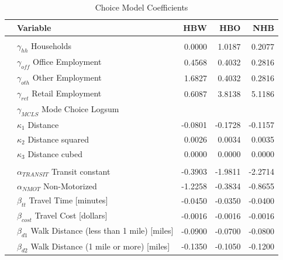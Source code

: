 \begin{table}

\caption{\label{tab:coeffs}Choice Model Coefficients}
\centering
\begin{tabular}[t]{llrrr}
\toprule
 & Variable & HBW & HBO & NHB\\
\midrule
\addlinespace[0.3em]
\multicolumn{5}{l}{\textbf{Destination Choice}}\\
\hspace{1em} & $\gamma_{hh}$ Households & 0.0000 & 1.0187 & 0.2077\\
\hspace{1em} & $\gamma_{off}$ Office Employment & 0.4568 & 0.4032 & 0.2816\\
\hspace{1em} & $\gamma_{oth}$ Other Employment & 1.6827 & 0.4032 & 0.2816\\
\hspace{1em} & $\gamma_{ret}$ Retail Employment & 0.6087 & 3.8138 & 5.1186\\
\hspace{1em} & $\gamma_{MCLS}$ Mode Choice Logsum &  &  & \\
\hspace{1em} & $\kappa_1$ Distance & -0.0801 & -0.1728 & -0.1157\\
\hspace{1em} & $\kappa_2$ Distance squared & 0.0026 & 0.0034 & 0.0035\\
\hspace{1em} & $\kappa_3$ Distance cubed & 0.0000 & 0.0000 & 0.0000\\
\cmidrule{1-5}
\addlinespace[0.3em]
\multicolumn{5}{l}{\textbf{Mode Choice}}\\

\hspace{1em} & $\alpha_{TRANSIT}$ Transit constant & -0.3903 & -1.9811 & -2.2714\\
\hspace{1em} & $\alpha_{NMOT}$ Non-Motorized & -1.2258 & -0.3834 & -0.8655\\
\hspace{1em} & $\beta_{tt}$ Travel Time [minutes] & -0.0450 & -0.0350 & -0.0400\\
\hspace{1em} & $\beta_{cost}$ Travel Cost [dollars] & -0.0016 & -0.0016 & -0.0016\\
\hspace{1em} & $\beta_{d1}$ Walk Distance (less than 1 mile) [miles] & -0.0900 & -0.0700 & -0.0800\\
\hspace{1em} & $\beta_{d2}$ Walk Distance (1 mile or more) [miles] & -0.1350 & -0.1050 & -0.1200\\
\bottomrule
\end{tabular}
\end{table}

